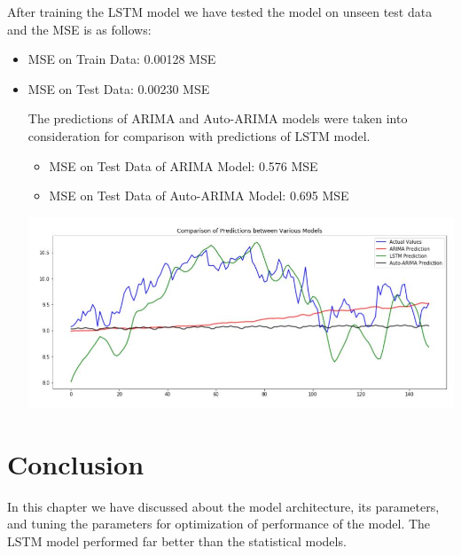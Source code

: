 After training the LSTM model we have tested the model on unseen test data and the MSE is as follows:
\begin{itemize}
\item MSE on Train Data: 0.00128 MSE
\item MSE on Test Data: 0.00230 MSE

The predictions of ARIMA and Auto-ARIMA models were taken into consideration for comparison with predictions of LSTM model. 
\begin{itemize}
\item MSE on Test Data of ARIMA Model:  0.576 MSE
\item MSE on Test Data of Auto-ARIMA Model:  0.695 MSE
\end{itemize}
				\begin{center}
				\includegraphics[width=\linewidth]{figures/Comp-ARIMA-LSTM.jpg}	
				\label{fig: Comparison of Prediction between ARIMA, Auto-ARIMAl  and LSTM Model with Actual Values}
				\end{center}
\end{itemize}
\section{Conclusion }

In this chapter we have discussed about the model architecture, its parameters, and tuning the parameters for optimization of performance of the model. The LSTM model performed far better than the statistical models.
